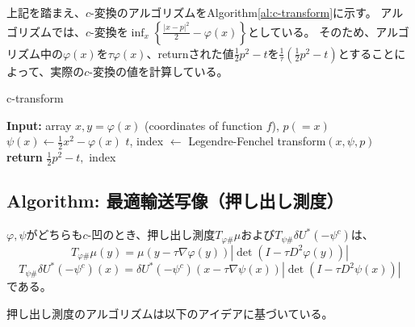 上記を踏まえ、$c$-変換のアルゴリズムをAlgorithm\ref{al:c-transform}に示す。
アルゴリズムでは、$c$-変換を$\inf_x\left\{\frac{|x-p|^2}{2} - \varphi(x)\right\}$としている。
そのため、アルゴリズム中の$\varphi(x)$を$\tau\varphi(x)$、returnされた値$\frac{1}{2} p^2 - t$を$\frac{1}{\tau}\left(\frac{1}{2} p^2 - t\right)$とすることによって、実際の$c$-変換の値を計算している。

\begin{algorithm}[tb]
    \caption{c-transform}
    \label{al:c-transform}
    \begin{algorithmic}[1]
        \State \textbf{Input:} array $x,y = \varphi(x)$ (coordinates of function $f$), $p(=x)$
        \State $\psi(x) \gets \frac{1}{2} x^2 - \varphi(x)$
        \State $t$, index $\gets$ Legendre-Fenchel transform$(x, \psi, p)$
        \State \textbf{return} $\frac{1}{2} p^2 - t, $ index
    \end{algorithmic}
\end{algorithm}


\subsection{Algorithm: 最適輸送写像（押し出し測度）}
\label{sect:al_pushforward}
$\varphi, \psi$がどちらも$c$-凹のとき、押し出し測度$T_{\varphi \#} \mu$および$T_{\psi \#} \delta U^*(- \psi^c)$は、
\begin{equation*}
    T_{\varphi \#} \mu (y) =\mu(y - \tau \nabla \varphi(y))|\det (I - \tau D^2 \varphi(y))|
\end{equation*}
\begin{equation*}
    T_{\psi \#} \delta U^* (- \psi^c)(x) =\delta U^* (- \psi^c)(x - \tau \nabla \psi(x))|\det (I - \tau D^2 \psi(x))|
\end{equation*}
である。

押し出し測度のアルゴリズムは以下のアイデアに基づいている。
    
